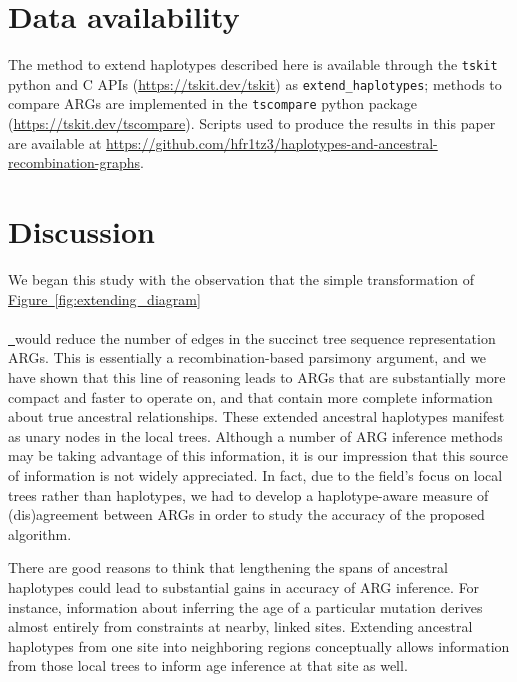 \documentclass[10pt,twoside,lineno]{gsajnl}
\newcommand{\tskit}{\texttt{tskit}}
\newcommand{\tscompare}{\texttt{tscompare}}
\newcommand*{\figref}[2][]{%
	\hyperref[{#2}]{%
		Figure~\ref*{#2}%
		\ifx\\#1\\%
		\else
		\,#1%
		\fi
	}%
}
\begin{document}
\section{Data availability}

The method to extend haplotypes described here is available through the \tskit{}
python and C APIs (\url{https://tskit.dev/tskit}) as \texttt{extend\_haplotypes};
methods to compare ARGs are implemented in the \tscompare{} python package
(\url{https://tskit.dev/tscompare}).
Scripts used to produce the results in this paper are available at
\url{https://github.com/hfr1tz3/haplotypes-and-ancestral-recombination-graphs}.


\section{Discussion}

We began this study with the observation that the simple transformation
of \figref{fig:extending_diagram} would reduce the number of edges
in the succinct tree sequence representation ARGs.
This is essentially a recombination-based parsimony argument,
and we have shown that this line of reasoning
leads to ARGs that are substantially more compact and faster to operate on,
and that contain more complete information about true ancestral relationships.
These extended ancestral haplotypes manifest as unary nodes in the local trees.
Although a number of ARG inference methods may be taking advantage of this information,
it is our impression that this source of information is not widely appreciated.
In fact, due to the field's focus on local trees rather than haplotypes,
we had to develop a haplotype-aware measure of (dis)agreement between ARGs in order to study the accuracy of the proposed algorithm.

There are good reasons to think that lengthening the spans of ancestral haplotypes
could lead to substantial gains in accuracy of ARG inference.
For instance, information about inferring the age of a particular mutation
derives almost entirely from constraints at nearby, linked sites.
Extending ancestral haplotypes from one site into neighboring regions
conceptually allows information from those local trees
to inform age inference at that site as well.
\end{document}
